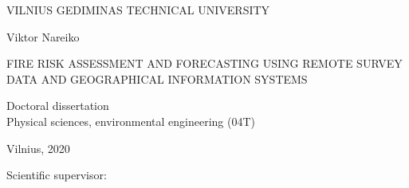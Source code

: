 \thispagestyle{empty}                   %

\begin{center}
	\vspace*{5mm}	
	
	VILNIUS GEDIMINAS TECHNICAL UNIVERSITY \\
	
	\vspace{45mm}
	
	Viktor Nareiko
	
	\vspace{15mm}
	
	
	FIRE RISK ASSESSMENT AND FORECASTING USING REMOTE SURVEY DATA AND GEOGRAPHICAL INFORMATION SYSTEMS

  	\vspace{30mm}
  
  	Doctoral dissertation\\[-6pt]  
  	Physical sciences, environmental engineering (04T)
  
  	\vspace{60mm}
  
  	Vilnius, 2020
  
\end{center}

\newpage
\thispagestyle{empty}                   %

\begin{singlespace}

	\vspace{1cm}

	\noindent Scientific supervisor:

	\vspace{1cm}


\end{singlespace}
